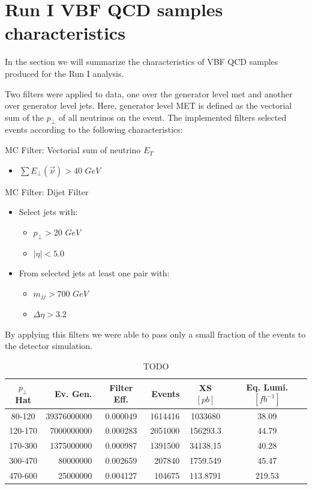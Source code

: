 \documentclass[a4paper]{article}
\begin{document}
\section{Run I VBF QCD samples characteristics}

In the section we will summarize the characteristics of VBF QCD samples produced for the Run I analysis.

Two filters were applied to data, one over the generator level met and another over generator level jets. Here, generator level MET is defined as the vectorial sum of the $p_\perp$ of all neutrinos on the event. The implemented filters selected events according to the following characteristics:

MC Filter: Vectorial sum of neutrino $E_T$
\begin{itemize}
  \item $\sum E_\perp(\vec{\nu}) > 40$ $GeV$
\end{itemize}

MC Filter: Dijet Filter
\begin{itemize}
  \item Select jets with:
  \begin{itemize}
    \item $p_\perp>20$ $GeV$
    \item $|\eta|<5.0$
  \end{itemize}
  \item From selected jets at least one pair with:
  \begin{itemize}
    \item $m_{jj}>700$ $GeV$
    \item $\Delta\eta>3.2$
  \end{itemize}    
\end{itemize}

By applying this filters we were able to pass only a small fraction of the events to the detector simulation.

\begin{table}
\centering

\begin{tabular}{|c|r|c|r|c|c|}
\hline
$p_\perp$ Hat & Ev. Gen. & Filter Eff. &  Events &  XS $[pb]$ & Eq. Lumi. $[fb^{-1}]$ \\
\hline \hline
80-120  & 39376000000 &    0.000049 & 1614416 &  1033680 &  38.09 \\
120-170 &  7000000000 &    0.000283 & 2051000 & 156293.3 &  44.79 \\
170-300 &  1375000000 &    0.000987 & 1391500 & 34138.15 &  40.28 \\
300-470 &    80000000 &    0.002659 &  207840 & 1759.549 &  45.47 \\
470-600 &    25000000 &    0.004127 &  104675 & 113.8791 & 219.53 \\
\hline
\end{tabular}

\caption{TODO}
\label{table_RunI_QCDFiltered_FilterEff}
\end{table}
\end{document}

